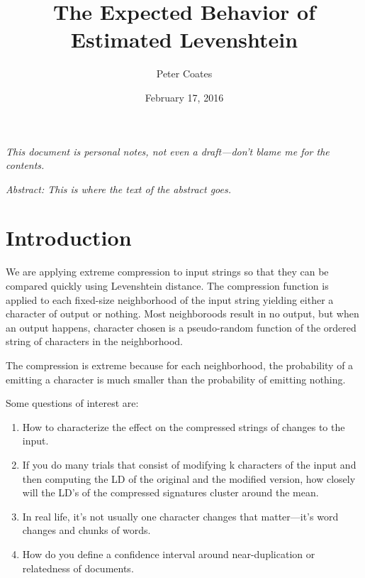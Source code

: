 \documentclass[html]{article}    %
\title{The Expected Behavior of Estimated Levenshtein}  %
\author{Peter Coates}    %
\date{February 17, 2016}   %
\begin{document}

\maketitle                 %


%
%
{\em  \noindent This document is personal notes, not even a draft---don't blame me for the contents.}


\vspace{5mm} 

{\em \noindent 
Abstract: This is where the text of the abstract goes. 
}

\vspace{10mm} 
\section{Introduction}

We are applying extreme compression to input strings so that they can be compared quickly using Levenshtein distance. 
The compression function is applied to each fixed-size neighborhood of the input string yielding
either a character of output or nothing.  
Most neighboroods result in no output, but when an output happens, character chosen is a pseudo-random function of the 
ordered string of characters in the neighborhood.

The compression is extreme because for each neighborhood, the probability of a emitting a character is 
much smaller than the probability of emitting nothing.

Some questions of interest are:
\begin{enumerate}
\item How to characterize the effect on the compressed strings of changes to the input.
\item If you do many trials that consist of modifying k characters of the input and then computing the LD of the original and
the modified version, how closely will the LD's of the compressed signatures cluster around the mean.
\item In real life, it's not usually one character changes that matter---it's word changes and chunks of words.
\item How do you define a confidence interval around near-duplication or relatedness of documents. 
\end{enumerate}
\end{document}
